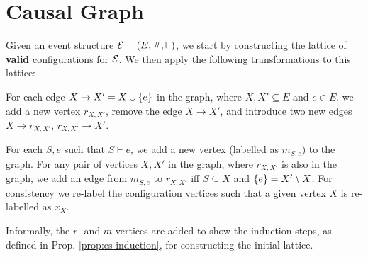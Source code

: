 \section{Causal Graph}

Given an event structure $\mathcal{E} = (E, \#, \vdash)$, we start by constructing
the lattice of \textbf{valid} configurations for $\mathcal{E}$. We then apply the following
transformations to this lattice:

For each edge $X \rightarrow X' = X \cup \left\{ e \right\}$ in the graph,
where $X, X' \subseteq E$ and $e \in E$,
we add a new vertex $r_{X,X'}$, remove the edge $X \rightarrow X'$,
and introduce two new edges $X \rightarrow r_{X,X'}$, $r_{X,X'} \rightarrow X'$.

For each $S, e$ such that $S \vdash e$, we add a new vertex
(labelled as $m_{S,e}$) to the graph. For any pair of vertices
$X, X'$ in the graph, where $r_{X,X'}$ is also in the graph, we add
an edge from $m_{S,e}$ to $r_{X,X'}$ iff $S \subseteq X$ and
$\left\{ e \right\} = X' \setminus X$. For consistency we re-label the configuration vertices
such that a given vertex $X$ is re-labelled as $x_{X}$.

Informally, the $r$- and $m$-vertices are added to show the
induction steps, as defined in Prop. \ref{prop:es-induction},
for constructing the initial lattice.

